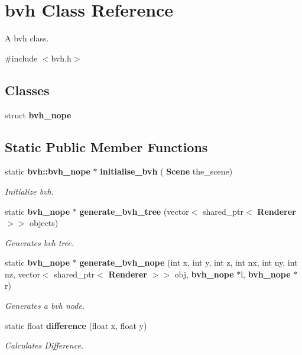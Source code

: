 \section{bvh Class Reference}
\label{classbvh}


A bvh class.  




{\ttfamily \#include $<$bvh.\+h$>$}

\subsection*{Classes}
\begin{DoxyCompactItemize}
\item 
struct \textbf{ bvh\+\_\+nope}
\end{DoxyCompactItemize}
\subsection*{Static Public Member Functions}
\begin{DoxyCompactItemize}
\item 
static \textbf{ bvh\+::bvh\+\_\+nope} $\ast$ \textbf{ initialise\+\_\+bvh} (\textbf{ Scene} the\+\_\+scene)
\begin{DoxyCompactList}\small\item\em Initialize bvh. \end{DoxyCompactList}\item 
static \textbf{ bvh\+\_\+nope} $\ast$ \textbf{ generate\+\_\+bvh\+\_\+tree} (vector$<$ shared\+\_\+ptr$<$ \textbf{ Renderer} $>$$>$ objects)
\begin{DoxyCompactList}\small\item\em Generates bvh tree. \end{DoxyCompactList}\item 
static \textbf{ bvh\+\_\+nope} $\ast$ \textbf{ generate\+\_\+bvh\+\_\+nope} (int x, int y, int z, int nx, int ny, int nz, vector$<$ shared\+\_\+ptr$<$ \textbf{ Renderer} $>$$>$ obj, \textbf{ bvh\+\_\+nope} $\ast$l, \textbf{ bvh\+\_\+nope} $\ast$r)
\begin{DoxyCompactList}\small\item\em Generates a bvh node. \end{DoxyCompactList}\item 
static float \textbf{ difference} (float x, float y)
\begin{DoxyCompactList}\small\item\em Calculates Difference. \end{DoxyCompactList}\end{DoxyCompactItemize}


